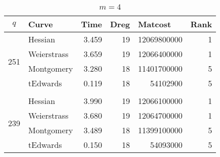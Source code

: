 \begin{table}[!h]
\centering
\caption{$m=4$}
\label{tb:m=4}
\begin{tabular}{clrrrr}
\hline
\multicolumn{1}{|c|}{$q$}                  & \multicolumn{1}{l|}{Curve}       & \multicolumn{1}{l|}{Time}  & \multicolumn{1}{l|}{Dreg} & \multicolumn{1}{l|}{Matcost}     & \multicolumn{1}{l|}{Rank} \\ \hline
\multicolumn{1}{|l|}{\multirow{4}{*}{251}} & \multicolumn{1}{l|}{Hessian}     & \multicolumn{1}{r|}{3.459} & \multicolumn{1}{r|}{19}   & \multicolumn{1}{r|}{12069800000} & \multicolumn{1}{r|}{1}    \\ \cline{2-6} 
\multicolumn{1}{|l|}{}                     & \multicolumn{1}{l|}{Weierstrass} & \multicolumn{1}{r|}{3.659} & \multicolumn{1}{r|}{19}   & \multicolumn{1}{r|}{12066400000} & \multicolumn{1}{r|}{1}    \\ \cline{2-6} 
\multicolumn{1}{|l|}{}                     & \multicolumn{1}{l|}{Montgomery}  & \multicolumn{1}{r|}{3.280} & \multicolumn{1}{r|}{18}   & \multicolumn{1}{r|}{11401700000} & \multicolumn{1}{r|}{5}    \\ \cline{2-6} 
\multicolumn{1}{|l|}{}                     & \multicolumn{1}{l|}{tEdwards}    & \multicolumn{1}{r|}{0.119} & \multicolumn{1}{r|}{18}   & \multicolumn{1}{r|}{54102900}    & \multicolumn{1}{r|}{5}    \\ \hline
 \vspace{-3mm}                                          &                                  & \multicolumn{1}{l}{}       & \multicolumn{1}{l}{}      & \multicolumn{1}{l}{}             & \multicolumn{1}{l}{}      \\ \hline
\multicolumn{1}{|l|}{\multirow{4}{*}{239}} & \multicolumn{1}{l|}{Hessian}     & \multicolumn{1}{r|}{3.990} & \multicolumn{1}{r|}{19}   & \multicolumn{1}{r|}{12066100000} & \multicolumn{1}{r|}{1}    \\ \cline{2-6} 
\multicolumn{1}{|l|}{}                     & \multicolumn{1}{l|}{Weierstrass} & \multicolumn{1}{r|}{3.680} & \multicolumn{1}{r|}{19}   & \multicolumn{1}{r|}{12064700000} & \multicolumn{1}{r|}{1}    \\ \cline{2-6} 
\multicolumn{1}{|l|}{}                     & \multicolumn{1}{l|}{Montgomery}  & \multicolumn{1}{r|}{3.489} & \multicolumn{1}{r|}{18}   & \multicolumn{1}{r|}{11399100000} & \multicolumn{1}{r|}{5}    \\ \cline{2-6} 
\multicolumn{1}{|l|}{}                     & \multicolumn{1}{l|}{tEdwards}    & \multicolumn{1}{r|}{0.150} & \multicolumn{1}{r|}{18}   & \multicolumn{1}{r|}{54093000}    & \multicolumn{1}{r|}{5}    \\ \hline
\end{tabular}
\end{table}


